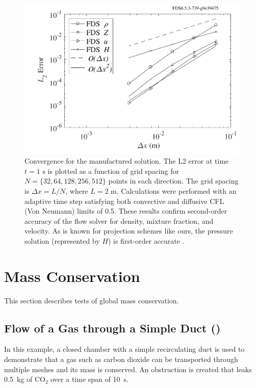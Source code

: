 \documentclass[11pt]{book}
\begin{document}
\begin{figure}
\centering
\includegraphics[width=.8\textwidth]{SCRIPT_FIGURES/shunn_mms_convergence.pdf}
\caption[Convergence of the manufactured solution]{\label{fig_mms_convergence} Convergence for the manufactured solution.  The L2 error at time $t = 1$ s is plotted as a function of grid spacing for $N=\{32,64,128,256,512\}$ points in each direction.  The grid spacing is $\Delta x = L/N$, where $L=2$ m.  Calculations were performed with an adaptive time step satisfying both convective and diffusive CFL (Von Neumann) limits of 0.5. These results confirm second-order accuracy of the flow solver for density, mixture fraction, and velocity. As is known for projection schemes like ours, the pressure solution (represented by $H$) is first-order accurate \cite{Armfield:2002}.}
\end{figure}


\clearpage

\section{Mass Conservation}

This section describes tests of global mass conservation.

\subsection{Flow of a Gas through a Simple Duct (\texorpdfstring{}{simple\_duct})}

In this example, a closed chamber with a simple recirculating duct is used to demonstrate that a gas such as carbon dioxide can be transported
through multiple meshes and its mass is conserved. An obstruction is created that leaks 0.5~kg of CO$_2$ over a time span of 10~s.
\end{document}
